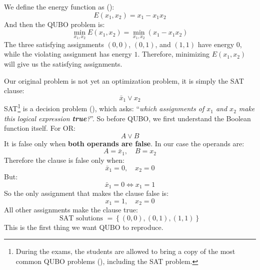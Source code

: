 \highspace
{} We define the energy function as ():
\begin{equation*}
    E(x_1, x_2) = x_1 - x_1 x_2
\end{equation*}
And then the QUBO problem is:
\begin{equation*}
    \boxed{\min_{x_1, x_2} E(x_1, x_2) = \min_{x_1, x_2} \left(x_1 - x_1 x_2\right)}
\end{equation*}
The three satisfying assignments $(0,0)$, $(0,1)$, and $(1,1)$ have energy $0$, while the violating assignment has energy $1$. Therefore, minimizing $E(x_1, x_2)$ will give us the satisfying assignments.

\highspace
\begin{deepeningbox}
    Our original problem is not yet an optimization problem, it is simply the SAT clause:
    \begin{equation*}
        \bar{x}_1 \vee x_2
    \end{equation*}
    SAT\footnote{%
        During the exams, the students are allowed to bring a copy of the most common QUBO problems (), including the SAT problem.%
    } is a decision problem (), which asks: ``\emph{which assignments of $x_1$ and $x_2$ make this logical expression \textbf{true}?}''. So before QUBO, we first understand the Boolean function itself. For OR:
    \begin{equation*}
        A \vee B
    \end{equation*}
    It is false only when \textbf{both operands are false}. In our case the operands are:
    \begin{equation*}
        A = \bar{x}_1, \quad B = x_2
    \end{equation*}
    Therefore the clause is false only when:
    \begin{equation*}
        \bar{x}_1 = 0, \quad x_2 = 0
    \end{equation*}
    But:
    \begin{equation*}
        \bar{x}_1 = 0 \iff x_1 = 1
    \end{equation*}
    So the only assignment that makes the clause false is:
    \begin{equation*}
        x_1 = 1, \quad x_2 = 0
    \end{equation*}
    All other assignments make the clause true:
    \begin{equation*}
        \text{SAT solutions } = \left\{(0,0), (0,1), (1,1)\right\}
    \end{equation*}
    This is the first thing we want QUBO to reproduce.


\end{deepeningbox}
